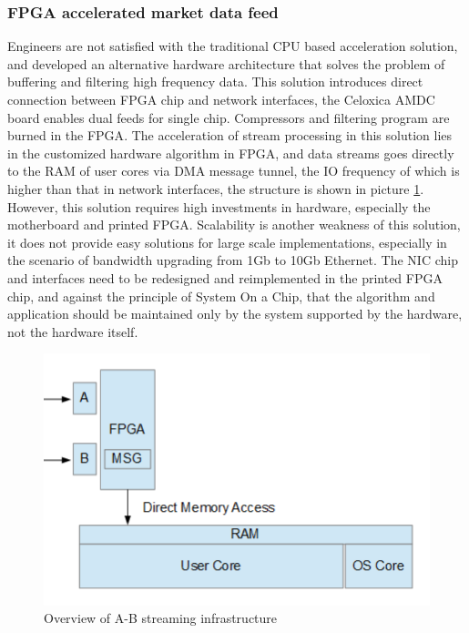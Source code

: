 \documentclass[11pt,openright,a4paper]{report}
\begin{document}
\subsubsection{FPGA accelerated market data feed}
Engineers are not satisfied with the traditional CPU based acceleration solution, and developed an alternative hardware architecture that solves the problem of buffering and filtering high frequency data. This solution introduces direct connection between FPGA chip and network interfaces, the Celoxica AMDC board enables dual feeds for single chip. Compressors and filtering program are burned in the FPGA\cite{morris2009fpga}. The acceleration of stream processing in this solution lies in the customized hardware algorithm in FPGA, and data streams goes directly to the RAM of user cores via DMA message tunnel, the IO frequency of which is higher than that in network interfaces, the structure is shown in picture \ref{fig:4}.\\
However, this solution requires high investments in hardware, especially the motherboard and printed FPGA. Scalability is another weakness of this solution, it does not provide easy solutions for large scale implementations, especially in the scenario of bandwidth upgrading from 1Gb to 10Gb Ethernet. The NIC chip and interfaces need to be redesigned and reimplemented in the printed FPGA chip, and against the principle of System On a Chip, that the algorithm and application should be maintained only by the system supported by the hardware, not the hardware itself\cite{klaas2004system}.\\
\begin{figure}[H]
	\centering\includegraphics[width=0.5\linewidth]{picture/FPGAcall.png}
	\caption{Overview of A-B streaming infrastructure}
	\label{fig:4}
\end{figure}
\end{document}
